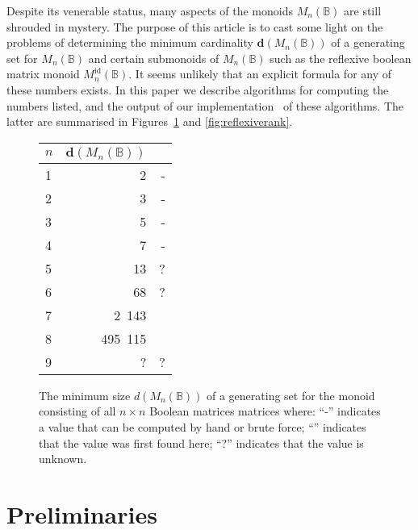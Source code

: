 \documentclass[11pt]{article}
\numberwithin{equation}{section}
\newcommand{\B}{\mathbb{B}}
\newcommand{\Bn}{M_n(\B)}
\newcommand{\Refn}{M_n^{\text{id}}(\B)}
\newcommand{\cmark}{\ding{51}}
\begin{document}
Despite its venerable status, many aspects of the monoids $\Bn$ are still
shrouded in mystery. The purpose of this article is to cast some light on the
problems of determining the minimum cardinality $\mathbf{d}(\Bn)$ of a
generating set for $\Bn$ and certain submonoids of $\Bn$ such as the reflexive
boolean matrix monoid $\Refn$.
It seems unlikely that an explicit formula for any of these numbers exists.
In this paper we describe algorithms for computing the numbers listed,
and the output of our implementation~\cite{} of these algorithms. The latter
are summarised in Figures~\ref{figure-table-1} and \ref{fig:reflexiverank}.

\begin{figure}
  \centering
  \begin{tabular}{l|r|r}
    $n$ & $\mathbf{d}(\Bn)$ &   \\
    \hline
    1 & 2          & - \\ 
    2 & 3          & - \\ 
    3 & 5          & - \\ 
    4 & 7          & - \\
    5 & 13         & ? \\
    6 & 68         & ? \\ 
    7 & 2\ 143     & \cmark \\
    8 & 495\ 115   & \cmark \\
    9 & ?          & ?
  \end{tabular}
\vspace{1cm}

  \caption{The minimum size $d(\Bn)$ of a generating set for the monoid
  consisting of all $n \times n$ Boolean matrices matrices where: 
  ``-'' indicates a value that can be computed by hand or brute force;
  ``\cmark'' indicates that the value was first found here;
  ``?'' indicates that the value is unknown.}
  \label{figure-table-1}
\end{figure}

\section{Preliminaries}
\label{section-preliminaries}
\end{document}
